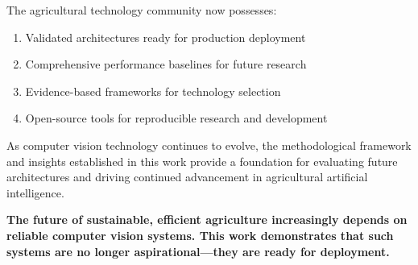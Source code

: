 The agricultural technology community now possesses:
\begin{enumerate}
    \item Validated architectures ready for production deployment
    \item Comprehensive performance baselines for future research
    \item Evidence-based frameworks for technology selection
    \item Open-source tools for reproducible research and development
\end{enumerate}

As computer vision technology continues to evolve, the methodological framework and insights established in this work provide a foundation for evaluating future architectures and driving continued advancement in agricultural artificial intelligence.

\textbf{The future of sustainable, efficient agriculture increasingly depends on reliable computer vision systems. This work demonstrates that such systems are no longer aspirational—they are ready for deployment.}
